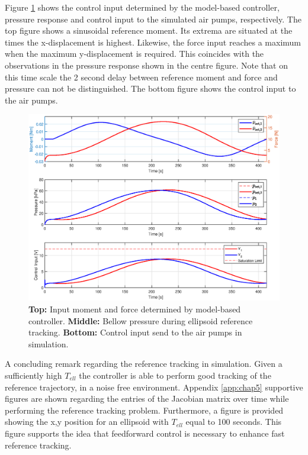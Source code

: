 Figure \ref{fig5:controlinputellipssim} shows the control input determined by the model-based controller, pressure response and control input to the simulated air pumps, respectively. The top figure shows a sinusoidal reference moment. Its extrema are situated at the times the x-displacement is highest. Likewise, the force input reaches a maximum when the maximum y-displacement is required. This coincides with the observations in the pressure response shown in the centre figure. Note that on this time scale the 2 second delay between reference moment and force and pressure can not be distinguished. The bottom figure shows the control input to the air pumps.


\begin{figure}[H]
    \centering
    \includegraphics[width = \textwidth]{Figures/Chapter5/controlinputTell400.eps}
    \caption{\textbf{Top:} Input moment and force determined by model-based controller. \textbf{Middle:} Bellow pressure during ellipsoid reference tracking. \textbf{Bottom:} Control input send to the air pumps in simulation.}
    \label{fig5:controlinputellipssim}
\end{figure}

A concluding remark regarding the reference tracking in simulation. Given a sufficiently high $T_{ell}$ the controller is able to perform good tracking of the reference trajectory, in a noise free environment. Appendix \ref{app:chap5} supportive figures are shown regarding the entries of the Jacobian matrix over time while performing the reference tracking problem. Furthermore, a figure is provided showing the x,y position for an ellipsoid with $T_{ell}$ equal to 100 seconds. This figure supports the idea that feedforward control is necessary to enhance fast reference tracking.

